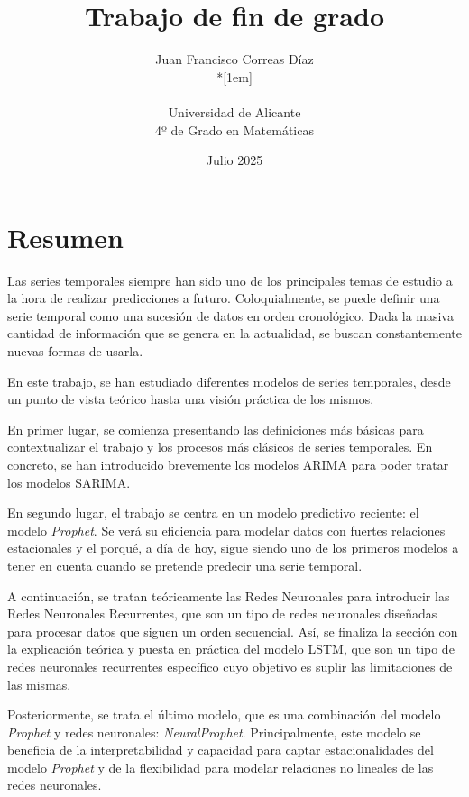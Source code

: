 \documentclass[12pt,twoside]{article}
\title{Trabajo de fin de grado}
\author{Juan Francisco Correas Díaz \\*[1em]
\begin{minipage}{0.75\textwidth}
\footnotesize \itshape
\begin{center}
Universidad de Alicante \\
4º de Grado en Matemáticas
\end{center}
\end{minipage}
}
\date{Julio 2025}
\begin{document}


\newpage



\section*{Resumen}

Las series temporales siempre han sido uno de los principales temas de estudio a la hora de realizar predicciones a futuro. Coloquialmente, se puede definir una serie temporal como una sucesión de datos en orden cronológico. Dada la masiva cantidad de información que se genera en la actualidad, se buscan constantemente nuevas formas de usarla.

En este trabajo, se han estudiado diferentes modelos de series temporales, desde un punto de vista teórico hasta una visión práctica de los mismos.

En primer lugar, se comienza presentando las definiciones más básicas para contextualizar el trabajo y los procesos más clásicos de series temporales. En concreto, se han introducido  brevemente los modelos ARIMA para poder tratar los modelos SARIMA.

En segundo lugar, el trabajo se centra en un modelo predictivo reciente: el modelo \textit{Prophet}. Se verá su eficiencia para modelar datos con fuertes relaciones estacionales y el porqué, a día de hoy, sigue siendo uno de los primeros modelos a tener en cuenta cuando se pretende predecir una serie temporal.

A continuación, se tratan teóricamente las Redes Neuronales para introducir las Redes Neuronales Recurrentes, que son un tipo de redes neuronales diseñadas para procesar datos que siguen un orden secuencial. Así, se finaliza la sección con la explicación teórica y puesta en práctica del modelo LSTM, que son un tipo de redes neuronales recurrentes específico cuyo objetivo es suplir las limitaciones de las mismas. 

Posteriormente, se trata el último modelo, que es una combinación del modelo \textit{Prophet} y redes neuronales: \textit{NeuralProphet}. Principalmente, este modelo se beneficia de la interpretabilidad y capacidad para captar estacionalidades del modelo \textit{Prophet} y de la flexibilidad para modelar relaciones no lineales de las redes neuronales.
\end{document}
